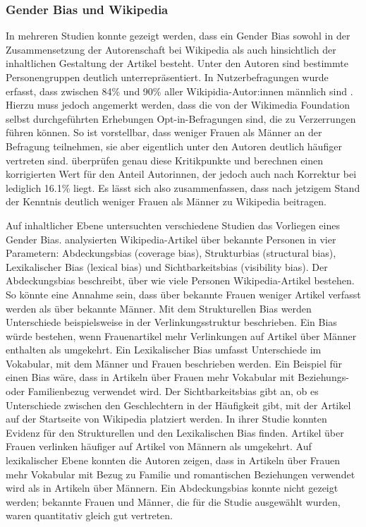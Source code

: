 \documentclass[11pt]{article}
\begin{document}
\subsubsection{Gender Bias und Wikipedia}
In mehreren Studien konnte gezeigt werden, dass ein Gender Bias sowohl in der Zusammensetzung der Autorenschaft bei Wikipedia als auch hinsichtlich der inhaltlichen Gestaltung der Artikel besteht. 
Unter den Autoren sind bestimmte Personengruppen deutlich unterrepräsentiert. In Nutzerbefragungen wurde erfasst, dass zwischen 84\% und 90\% aller Wikipidia-Autor:innen männlich sind \parencite{wikimediaReport,GraellsGarrido2015}. Hierzu muss jedoch angemerkt werden, dass die von der Wikimedia Foundation selbst durchgeführten Erhebungen Opt-in-Befragungen sind, die zu Verzerrungen führen können. So ist vorstellbar, dass weniger Frauen als Männer an der Befragung teilnehmen, sie aber eigentlich unter den Autoren deutlich häufiger vertreten sind. \textcite{Hill2013} überprüfen genau diese Kritikpunkte und berechnen einen korrigierten Wert für den Anteil Autorinnen, der jedoch auch nach Korrektur bei lediglich 16.1\% liegt. Es lässt sich also zusammenfassen, dass nach jetzigem Stand der Kenntnis deutlich weniger Frauen als Männer zu Wikipedia beitragen.

Auf inhaltlicher Ebene untersuchten verschiedene Studien das Vorliegen eines Gender Bias. \textcite{Wagner2015} analysierten Wikipedia-Artikel über bekannte Personen in vier Parametern: Abdeckungsbias (coverage bias), Strukturbias (structural bias), Lexikalischer Bias (lexical bias) und Sichtbarkeitsbias (visibility bias). Der Abdeckungsbias beschreibt, über wie viele Personen Wikipedia-Artikel bestehen. So könnte eine Annahme sein, dass über bekannte Frauen weniger Artikel verfasst werden als über bekannte Männer. Mit dem Strukturellen Bias werden Unterschiede beispielsweise in der Verlinkungsstruktur beschrieben. Ein Bias würde bestehen, wenn Frauenartikel mehr Verlinkungen auf Artikel über Männer enthalten als umgekehrt. Ein Lexikalischer Bias umfasst Unterschiede im Vokabular, mit dem Männer und Frauen beschrieben werden. Ein Beispiel für einen Bias wäre, dass in Artikeln über Frauen mehr Vokabular mit Beziehungs- oder Familienbezug verwendet wird. Der Sichtbarkeitsbias gibt an, ob es Unterschiede zwischen den Geschlechtern in der Häufigkeit gibt, mit der Artikel auf der Startseite von Wikipedia platziert werden.
In ihrer Studie konnten \textcite{Wagner2015} Evidenz für den Strukturellen und den Lexikalischen Bias finden. Artikel über Frauen verlinken häufiger auf Artikel von Männern als umgekehrt. Auf lexikalischer Ebene konnten die Autoren zeigen, dass in Artikeln über Frauen mehr Vokabular mit Bezug zu Familie und romantischen Beziehungen verwendet wird als in Artikeln über Männern. Ein Abdeckungsbias konnte nicht gezeigt werden; bekannte Frauen und Männer, die für die Studie ausgewählt wurden, waren quantitativ gleich gut vertreten.
\end{document}
